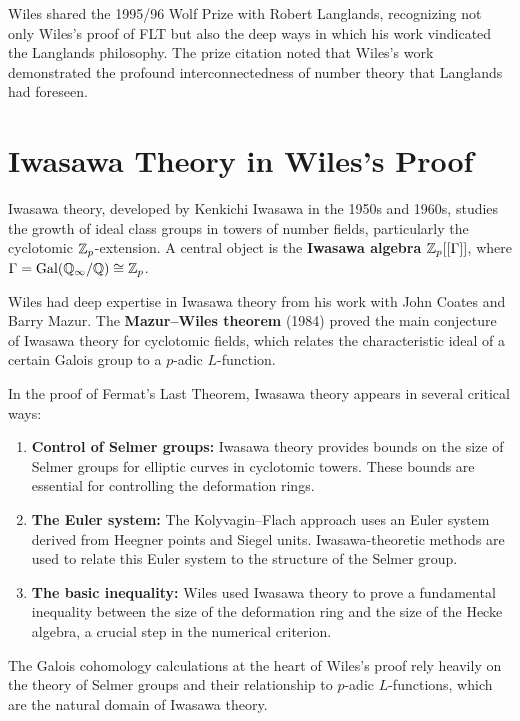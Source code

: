 Wiles shared the 1995/96 Wolf Prize with Robert Langlands, recognizing not only Wiles's proof of FLT but also the deep ways in which his work vindicated the Langlands philosophy. The prize citation noted that Wiles's work demonstrated the profound interconnectedness of number theory that Langlands had foreseen.

\section{Iwasawa Theory in Wiles's Proof}

Iwasawa theory, developed by Kenkichi Iwasawa in the 1950s and 1960s, studies the growth of ideal class groups in towers of number fields, particularly the cyclotomic \(\mathbb{Z}_p\)-extension. A central object is the \textbf{Iwasawa algebra} \(\mathbb{Z}_p[[\Gamma]]\), where \(\Gamma = \operatorname{Gal}(\mathbb{Q}_\infty/\mathbb{Q}) \cong \mathbb{Z}_p\).

Wiles had deep expertise in Iwasawa theory from his work with John Coates and Barry Mazur. The \textbf{Mazur--Wiles theorem} (1984) proved the main conjecture of Iwasawa theory for cyclotomic fields, which relates the characteristic ideal of a certain Galois group to a \(p\)-adic \(L\)-function.

In the proof of Fermat's Last Theorem, Iwasawa theory appears in several critical ways:

\begin{enumerate}
    \item \textbf{Control of Selmer groups:} Iwasawa theory provides bounds on the size of Selmer groups for elliptic curves in cyclotomic towers. These bounds are essential for controlling the deformation rings.
    \item \textbf{The Euler system:} The Kolyvagin--Flach approach uses an Euler system derived from Heegner points and Siegel units. Iwasawa-theoretic methods are used to relate this Euler system to the structure of the Selmer group.
    \item \textbf{The basic inequality:} Wiles used Iwasawa theory to prove a fundamental inequality between the size of the deformation ring and the size of the Hecke algebra, a crucial step in the numerical criterion.
\end{enumerate}

The Galois cohomology calculations at the heart of Wiles's proof rely heavily on the theory of Selmer groups and their relationship to \(p\)-adic \(L\)-functions, which are the natural domain of Iwasawa theory.

